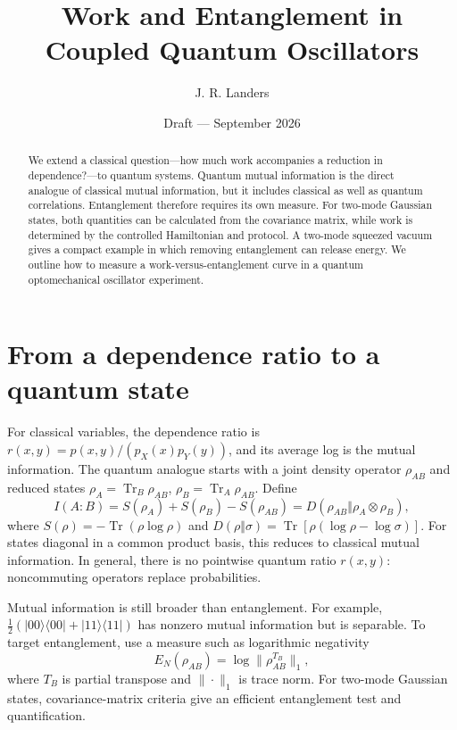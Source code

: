 \documentclass[9pt]{article}
\title{Work and Entanglement in Coupled Quantum Oscillators}
\author{J. R. Landers}
\date{Draft --- September 2026}
\begin{document}
\maketitle
\vspace{-1em}
\begin{abstract}
We extend a classical question---how much work accompanies a reduction in dependence?---to quantum systems. Quantum mutual information is the direct analogue of classical mutual information, but it includes classical as well as quantum correlations. Entanglement therefore requires its own measure. For two-mode Gaussian states, both quantities can be calculated from the covariance matrix, while work is determined by the controlled Hamiltonian and protocol. A two-mode squeezed vacuum gives a compact example in which removing entanglement can release energy. We outline how to measure a work-versus-entanglement curve in a quantum optomechanical oscillator experiment.
\end{abstract}

\section{From a dependence ratio to a quantum state}
For classical variables, the dependence ratio is $r(x,y)=p(x,y)/(p_X(x)p_Y(y))$, and its average log is the mutual information. The quantum analogue starts with a joint density operator $\rho_{AB}$ and reduced states $\rho_A=\operatorname{Tr}_B\rho_{AB}$, $\rho_B=\operatorname{Tr}_A\rho_{AB}$. Define
\begin{equation}
 I(A\!:\!B)=S(\rho_A)+S(\rho_B)-S(\rho_{AB})
 =D(\rho_{AB}\Vert\rho_A\otimes\rho_B),
\end{equation}
where $S(\rho)=-\operatorname{Tr}(\rho\log\rho)$ and $D(\rho\Vert\sigma)=\operatorname{Tr}[\rho(\log\rho-\log\sigma)]$. For states diagonal in a common product basis, this reduces to classical mutual information. In general, there is no pointwise quantum ratio $r(x,y)$: noncommuting operators replace probabilities.

Mutual information is still broader than entanglement. For example, $\frac12(|00\rangle\langle00|+|11\rangle\langle11|)$ has nonzero mutual information but is separable. To target entanglement, use a measure such as logarithmic negativity
\begin{equation}
 E_N(\rho_{AB})=\log\|\rho_{AB}^{T_B}\|_1,
\end{equation}
where $T_B$ is partial transpose and $\|\cdot\|_1$ is trace norm. For two-mode Gaussian states, covariance-matrix criteria give an efficient entanglement test and quantification.\cite{vidal2002,duan2000,weedbrook2012}
\end{document}
